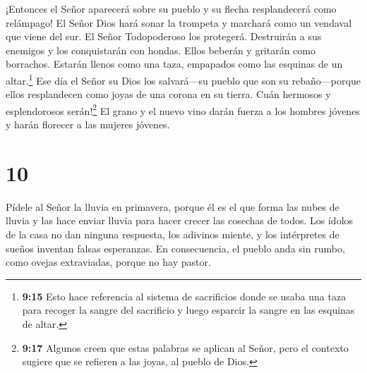  ¡Entonces el Señor aparecerá sobre su pueblo y su flecha
resplandecerá como relámpago! El Señor Dios hará sonar la trompeta y
marchará como un vendaval que viene del sur.  El Señor
Todopoderoso los protegerá. Destruirán a sus enemigos y los conquistarán
con hondas. Ellos beberán y gritarán como borrachos. Estarán llenos como
una taza, empapados como las esquinas de un altar.\footnote{\textbf{9:15}
  Esto hace referencia al sistema de sacrificios donde se usaba una taza
  para recoger la sangre del sacrificio y luego esparcir la sangre en
  las esquinas de altar.}  Ese día el Señor su Dios los
salvará---su pueblo que son su rebaño---porque ellos resplandecen como
joyas de una corona en su tierra.  Cuán hermosos y
esplendorosos serán!\footnote{\textbf{9:17} Algunos creen que estas
  palabras se aplican al Señor, pero el contexto sugiere que se refieren
  a las joyas, al pueblo de Dios.} El grano y el nuevo vino darán fuerza
a los hombres jóvenes y harán florecer a las mujeres jóvenes.

\hypertarget{section-9}{%
\section{10}\label{section-9}}

 Pídele al Señor la lluvia en primavera, porque él es el que
forma las nubes de lluvia y las hace enviar lluvia para hacer crecer las
cosechas de todos.  Los ídolos de la casa no dan ninguna
respuesta, los adivinos miente, y los intérpretes de sueños inventan
falsas esperanzas. En consecuencia, el pueblo anda sin rumbo, como
ovejas extraviadas, porque no hay pastor.

